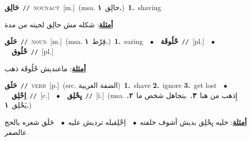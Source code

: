 \documentclass[10pt,a4paper,twoside]{article} %
\begin{document}
\begin{multicols}{2}
{\setlength\topsep{0pt}\textbf{\foreignlanguage{arabic}{حَالِق}}\ {\color{gray}\texttt{//}\color{black}}\ \textsc{noun\textunderscore act}\ [m.]\ \color{gray}(msa. \foreignlanguage{arabic}{حالِق}~\foreignlanguage{arabic}{\textbf{١.}})\color{black}\ \textbf{1.}~shaving\  \begin{flushright}\color{gray}\foreignlanguage{arabic}{\textbf{\underline{\foreignlanguage{arabic}{أمثلة}}}: شكله مش حالِق لحيته من مدة}\end{flushright}\color{black}} \vspace{2mm}

{\setlength\topsep{0pt}\textbf{\foreignlanguage{arabic}{حَلَق}}\ {\color{gray}\texttt{//}\color{black}}\ \textsc{noun}\ [m.]\ \color{gray}(msa. \foreignlanguage{arabic}{قِرْط}~\foreignlanguage{arabic}{\textbf{١.}})\color{black}\ \textbf{1.}~earing\ \ $\bullet$\ \ \setlength\topsep{0pt}\textbf{\foreignlanguage{arabic}{حْلُوقَة}}\ {\color{gray}\texttt{//}\color{black}}\ [pl.]\ \ $\bullet$\ \ \setlength\topsep{0pt}\textbf{\foreignlanguage{arabic}{حْلُوق}}\ {\color{gray}\texttt{//}\color{black}}\ [pl.]\  \begin{flushright}\color{gray}\foreignlanguage{arabic}{\textbf{\underline{\foreignlanguage{arabic}{أمثلة}}}: ماعنديش حْلُوقَة ذهب}\end{flushright}\color{black}} \vspace{2mm}

{\setlength\topsep{0pt}\textbf{\foreignlanguage{arabic}{حَلَق}}\ {\color{gray}\texttt{//}\color{black}}\ \textsc{verb}\ [p.]\ (src. \color{gray}\foreignlanguage{arabic}{الضفة الغربية}\color{black})\ \textbf{1.}~shave  \textbf{2.}~ignore  \textbf{3.}~get lost\ \ $\bullet$\ \ \setlength\topsep{0pt}\textbf{\foreignlanguage{arabic}{اِحْلِق}}\ {\color{gray}\texttt{//}\color{black}}\ [c.]\ \ $\bullet$\ \ \setlength\topsep{0pt}\textbf{\foreignlanguage{arabic}{يِحْلِق}}\ {\color{gray}\texttt{//}\color{black}}\ [i.]\ \color{gray}(msa. \foreignlanguage{arabic}{إِذهب من هنا}~\foreignlanguage{arabic}{\textbf{٣.}}  .\foreignlanguage{arabic}{يتجاهل شخص ما}~\foreignlanguage{arabic}{\textbf{٢.}}  \foreignlanguage{arabic}{يَحْلِق}~\foreignlanguage{arabic}{\textbf{١.}})\color{black}\  \begin{flushright}\color{gray}\foreignlanguage{arabic}{\textbf{\underline{\foreignlanguage{arabic}{أمثلة}}}: خليه يِحْلِق بديش أشوف خلفته\ $\bullet$\ \  اِحْلِقيله ترديش عليه\ $\bullet$\ \  حَلَق شعره بالحج عالصفر}\end{flushright}\color{black}} \vspace{2mm}


\end{multicols}
\end{document}
